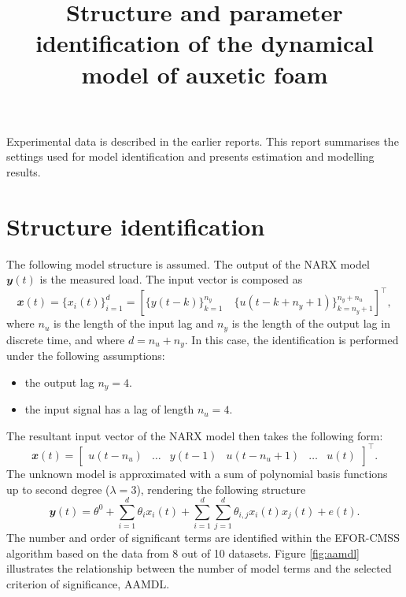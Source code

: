 \documentclass[a4paper,11pt,twoside]{article}
\title{Structure and parameter identification of the dynamical model of auxetic foam}
\def\ny{4}
\def\nu{4}
\def\order{3}
\theoremstyle{mytheoremstyle}
\begin{document}
	\maketitle
\par Experimental data is described in the earlier reports. This report summarises the settings used for model identification and presents estimation and modelling results.
\section{Structure identification}
\par The following model structure is assumed. The output of the NARX model $\mathbfit{y}(t)$ is the measured load. The input vector is composed as
\begin{equation}
	\mathbfit{x}(t) = \{x_i(t)\}^{d}_{i=1} = \left[\{y(t - k)\}^{n_y}_{k=1} \quad \{u(t - k + n_y + 1)\}^{n_y + n_u}_{k= n_y + 1} \right]^{\top},
\end{equation}
where $n_u$ is the length of the input lag and $n_y$ is the length of the output lag in discrete time, and where $d = n_u + n_y$. In this case, the identification is performed under the following assumptions:
\begin{itemize}[noitemsep,topsep=0.3pt,parsep=0.3pt,partopsep=0.2pt,labelindent=1cm] 
	\item the output lag $n_y =\ny$.
	\item the input signal has a lag of length $n_u = \nu$.
\end{itemize}
The resultant input vector of the NARX model then takes the following form:
\begin{equation}
\mathbfit{x}(t) = \left[\begin{array}{cccccc}
u(t-n_u) & \dots & y(t-1) & u(t-n_u+1) & \dots & u(t)
\end{array}\right]^{\top}.
\end{equation}
The unknown model is approximated with a sum of polynomial basis functions up to second degree ($\lambda = \order$), rendering the following structure
\begin{equation}\label{eq:narx}
	\mathbfit{y}(t) = \theta^0 + \sum_{i=1}^{d} \theta_i x_i(t) + \sum_{i=1}^{d} \sum_{j=1}^{d} \theta_{i,j} x_i(t) x_j(t) + e(t).
\end{equation}
The number and order of significant terms are identified within the EFOR-CMSS algorithm based on the data from 8 out of 10 datasets. Figure \ref{fig:aamdl} illustrates the relationship between the number of model terms and the selected criterion of significance, AAMDL.
\end{document}

